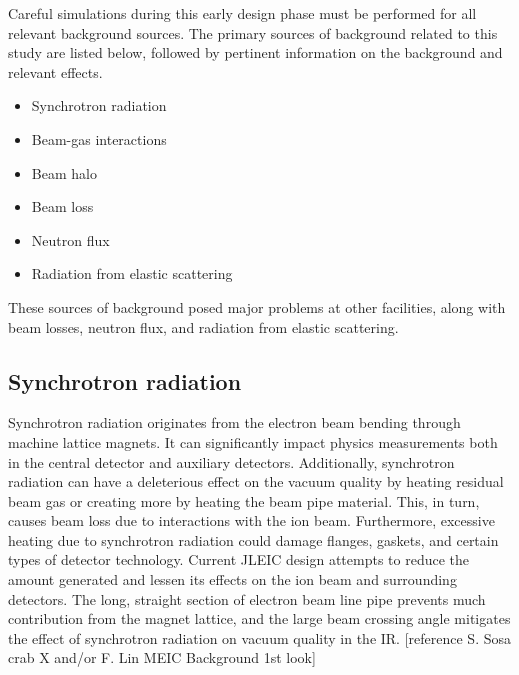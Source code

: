 
Careful simulations during this early design phase must be performed for all relevant background sources.  The primary sources of background related to this study are listed below, followed by pertinent information on the background and relevant effects.
\begin{itemize}
	\item Synchrotron radiation
	\item Beam-gas interactions
	\item Beam halo
	\item Beam loss
	\item Neutron flux
	\item Radiation from elastic scattering
\end{itemize}

These sources of background posed major problems at other facilities, along with beam losses, neutron flux, and radiation from elastic scattering.

\subsection{Synchrotron radiation}

Synchrotron radiation originates from the electron beam bending through machine lattice magnets.  It can significantly impact physics measurements both in the central detector and auxiliary detectors.  Additionally, synchrotron radiation can have a deleterious effect on the vacuum quality by heating residual beam gas or creating more by heating the beam pipe material.  This, in turn, causes beam loss due to interactions with the ion beam.  Furthermore, excessive heating due to synchrotron radiation could damage flanges, gaskets, and certain types of detector technology.
Current JLEIC design attempts to reduce the amount generated and lessen its effects on the ion beam and surrounding detectors.  The long, straight section of electron beam line pipe prevents much contribution from the magnet lattice, and the large beam crossing angle mitigates the effect of synchrotron radiation on vacuum quality in the IR. [reference S. Sosa crab X and/or F. Lin MEIC Background 1st look]

